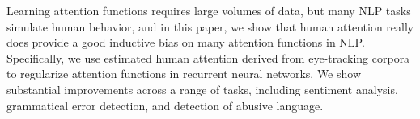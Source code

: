Learning attention functions requires large volumes of data, but many NLP tasks simulate human behavior, and in this paper, we show that human attention really does provide a good inductive bias on many attention functions in NLP. Specifically, we use estimated human attention derived from eye-tracking corpora to regularize attention functions in recurrent neural networks. We show substantial improvements across a range of tasks, including sentiment analysis, grammatical error detection, and detection of abusive language.
